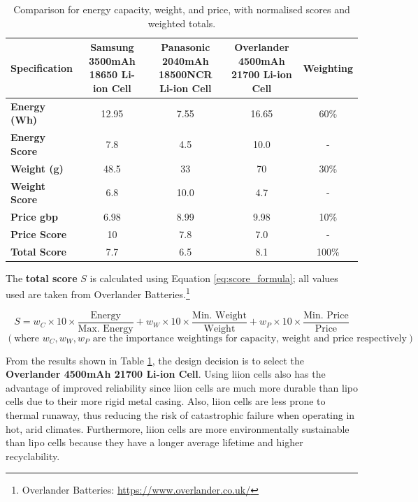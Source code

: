 \begin{table}[h!]
\centering
\begin{tabular}{|l|c|c|c|c|}
\hline
\textbf{Specification} & 
\makecell{\textbf{Samsung}\\\textbf{3500mAh}\\\textbf{18650 Li-ion Cell}} &
\makecell{\textbf{Panasonic}\\\textbf{2040mAh}\\\textbf{18500NCR Li-ion Cell}} & 
\makecell{\textbf{Overlander}\\\textbf{4500mAh}\\\textbf{21700 Li-ion Cell}} & 
\textbf{Weighting} \\
\hline
\textbf{Energy (Wh)} & 12.95 & 7.55 & 16.65 & 60\%\\
\textbf{Energy Score} & 7.8& 4.5& 10.0& - \\\hline
\textbf{Weight (g)} & 48.5 & 33 & 70 & 30\% \\
\textbf{Weight Score} & 6.8& 10.0& 4.7& - \\
\hline
\textbf{Price \acrshort{gbp}} & 6.98 & 8.99 & 9.98& 10\%\\
\textbf{Price Score} & 10& 7.8& 7.0& - \\
\hline
\textbf{Total Score} & 7.7& 6.5& 8.1& 100\% \\
\hline
\end{tabular}
\caption[Battery Cell Comparison]{Comparison for energy capacity, weight, and price, with normalised scores and weighted totals.}
\label{tab:battery_comparison}
\end{table}

The \textbf{total score} \( S \) is calculated using Equation \ref{eq:score_formula}; all values used are taken from Overlander Batteries.\footnote{Overlander Batteries: \url{https://www.overlander.co.uk/}}

\begin{equation} \label{eq:score_formula}
S = w_C \times 10 \times\frac{\text{Energy}}{\text{Max. Energy}} + w_W \times 10 \times\frac{\text{Min. Weight}}{\text{Weight}} + w_P \times 10 \times\frac{\text{Min. Price}}{\text{Price}}
\end{equation}
\[(
\text{where }w_C, w_W, w_P \text{ are the importance weightings for capacity, weight and price respectively})
\]

From the results shown in Table \ref{tab:battery_comparison}, the design decision is to select the \textbf{Overlander 4500mAh 21700 Li-ion Cell}. Using \acrshort{liion} cells also has the advantage of improved reliability since \acrshort{liion} cells are much more durable than \acrshort{lipo} cells due to their more rigid metal casing. Also, \acrshort{liion} cells are less prone to thermal runaway, thus reducing the risk of catastrophic failure when operating in hot, arid climates. Furthermore, \acrshort{liion} cells are more environmentally sustainable than \acrshort{lipo} cells because they have a longer average lifetime and higher recyclability.

